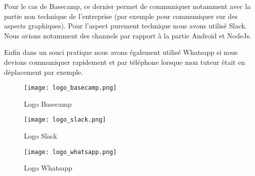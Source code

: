 Pour le cas de Basecamp, ce dernier permet de communiquer notamment avec la partie non technique de l'entreprise (par exemple pour communiquer sur des aspects graphiques). Pour l'aspect purement technique nous avons utilisé Slack. Nous avions notamment des channels par rapport à la partie Android et NodeJs.

Enfin dans un souci pratique nous avons également utilisé Whatsapp si nous devions communiquer rapidement et par téléphone lorsque mon tuteur était en déplacement par exemple.

\begin{figure}[!htb]
  \centering
  \begin{minipage}[b]{0.2\textwidth}
    \texttt{[image: logo\_basecamp.png]}
    \caption{Logo Basecamp}
  \end{minipage}
  \hfill
  \begin{minipage}[b]{0.2\textwidth}
    \texttt{[image: logo\_slack.png]}
    \caption{Logo Slack}
  \end{minipage}
    \hfill
  \begin{minipage}[b]{0.2\textwidth}
    \texttt{[image: logo\_whatsapp.png]}
    \caption{Logo Whatsapp}
  \end{minipage}
\end{figure}



